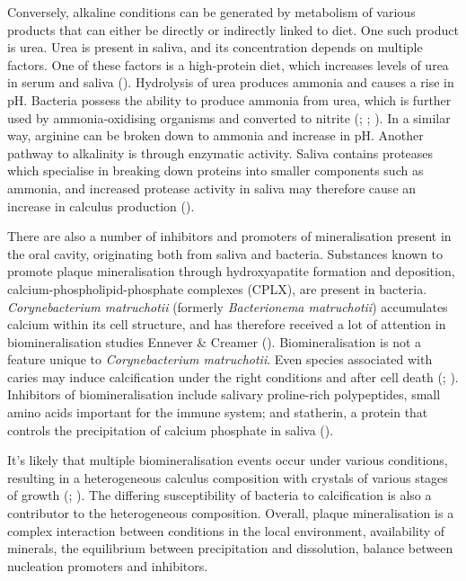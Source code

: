 \documentclass[
  b5paper,
]{book}
\begin{document}
Conversely, alkaline conditions can be generated by metabolism of
various products that can either be directly or indirectly linked to
diet. One such product is urea. Urea is present in saliva, and its
concentration depends on multiple factors. One of these factors is a
high-protein diet, which increases levels of urea in serum and saliva
(). Hydrolysis
of urea produces ammonia and causes a rise in pH. Bacteria possess the
ability to produce ammonia from urea, which is further used by
ammonia-oxidising organisms and converted to nitrite
(;
;
). In a
similar way, arginine can be broken down to ammonia and increase in pH.
Another pathway to alkalinity is through enzymatic activity. Saliva
contains proteases which specialise in breaking down proteins into
smaller components such as ammonia, and increased protease activity in
saliva may therefore cause an increase in calculus production
().

There are also a number of inhibitors and promoters of mineralisation
present in the oral cavity, originating both from saliva and bacteria.
Substances known to promote plaque mineralisation through hydroxyapatite
formation and deposition, calcium-phospholipid-phosphate complexes
(CPLX), are present in bacteria. \emph{Corynebacterium matruchotii}
(formerly \emph{Bacterionema matruchotii}) accumulates calcium within
its cell structure, and has therefore received a lot of attention in
biomineralisation studies Ennever \& Creamer
().
Biomineralisation is not a feature unique to \emph{Corynebacterium
matruchotii}. Even species associated with caries may induce
calcification under the right conditions and after cell death
(;
).
Inhibitors of biomineralisation include salivary proline-rich
polypeptides, small amino acids important for the immune system; and
statherin, a protein that controls the precipitation of calcium
phosphate in saliva ().

It's likely that multiple biomineralisation events occur under various
conditions, resulting in a heterogeneous calculus composition with
crystals of various stages of growth
(; ). The differing susceptibility of bacteria to
calcification is also a contributor to the heterogeneous composition.
Overall, plaque mineralisation is a complex interaction between
conditions in the local environment, availability of minerals, the
equilibrium between precipitation and dissolution, balance between
nucleation promoters and inhibitors.
\end{document}
